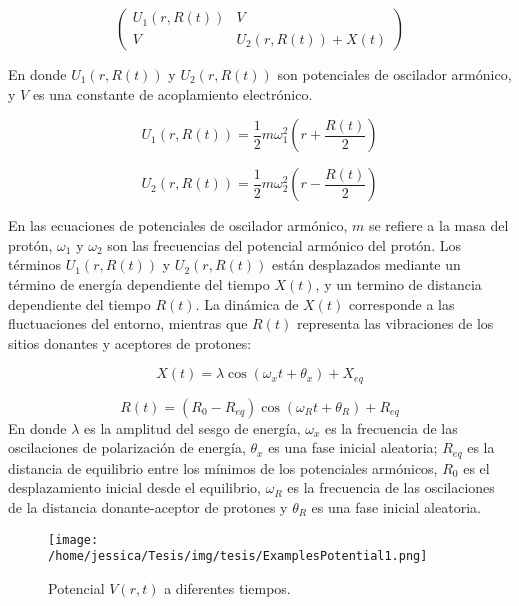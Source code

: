 \begin{equation}
  \label{eq:matrixPot}
  \begin{pmatrix}
    U_1(r,R(t)) &   V \\
    V           & U_2(r,R(t))+X(t)
  \end{pmatrix}
\end{equation}

En donde $U_1(r,R(t))$ y  $U_2(r,R(t))$ son potenciales de oscilador armónico, y $V$ es una constante de acoplamiento electrónico.

\begin{equation}
  \label{eq:U1}
  U_1(r,R(t))=\frac{1}{2}m\omega_1^2\left( r + \frac{R(t)}{2} \right)
\end{equation}

\begin{equation}
  \label{eq:U2}
  U_2(r,R(t))=\frac{1}{2}m\omega_2^2\left( r - \frac{R(t)}{2} \right)
\end{equation}

En las ecuaciones de potenciales de oscilador armónico, $m$ se refiere a la masa del protón, $\omega_1$ y $\omega_2$  son las frecuencias del potencial armónico del protón. Los términos $U_1(r,R(t))$ y  $U_2(r,R(t))$ están desplazados mediante un término de energía dependiente del tiempo $X(t)$, y un termino de distancia dependiente del tiempo $R(t)$. La dinámica de $X(t)$ corresponde a las fluctuaciones del entorno, mientras que $R(t)$ representa las vibraciones de los sitios donantes y aceptores de protones: \cite{Main:2021}

\begin{equation}
  \label{eq:X(t)}
  X(t)=\lambda \cos(\omega_xt+\theta_x)+X_{eq}
\end{equation}

\begin{equation}
  \label{eq:R(t)}
  R(t)=(R_0-R_{eq})\cos(\omega_Rt + \theta_R) + R_{eq}
\end{equation}
En donde $\lambda$ es la amplitud del sesgo de energía, $\omega_x$ es la frecuencia de las oscilaciones de polarización de energía, $\theta_x$ es una fase inicial aleatoria; $R_{eq}$ es la distancia de equilibrio entre los mínimos de los potenciales armónicos, $R_0$ es el desplazamiento inicial desde el equilibrio, $\omega_R$ es la frecuencia de las oscilaciones de la distancia donante-aceptor de protones y $\theta_R$ es una fase inicial aleatoria. \cite{Main:2021}



\begin{figure}[ht]
  \centering
  \texttt{[image: /home/jessica/Tesis/img/tesis/ExamplesPotential1.png]}
  \caption{Potencial $V(r,t)$ a diferentes tiempos.}
  \label{fig:drawPot}
\end{figure}

